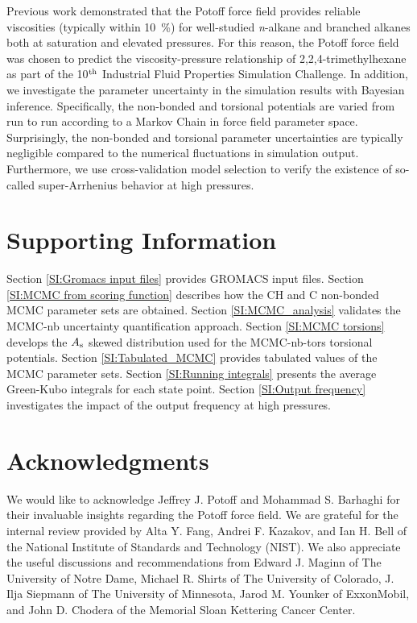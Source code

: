 \documentclass[preprint,review,12pt]{elsarticle}
\begin{document}
    Previous work demonstrated that the Potoff force field provides reliable viscosities (typically within 10~\%) for well-studied \textit{n}-alkane and branched alkanes both at saturation and elevated pressures. For this reason, the Potoff force field was chosen to predict the viscosity-pressure relationship of 2,2,4-trimethylhexane as part of the 10$^{\rm th}$ Industrial Fluid Properties Simulation Challenge. In addition, we investigate the parameter uncertainty in the simulation results with Bayesian inference. Specifically, the non-bonded and torsional potentials are varied from run to run according to a Markov Chain in force field parameter space. Surprisingly, the non-bonded and torsional parameter uncertainties are typically negligible compared to the numerical fluctuations in simulation output. Furthermore, we use cross-validation model selection to verify the existence of so-called super-Arrhenius behavior at high pressures.
	
	\section*{Supporting Information}
	
    Section \ref{SI:Gromacs input files} provides GROMACS input files. Section \ref{SI:MCMC from scoring function} describes how the CH and C non-bonded MCMC parameter sets are obtained. Section \ref{SI:MCMC_analysis} validates the MCMC-nb uncertainty quantification approach. Section \ref{SI:MCMC torsions} develops the $A_{\rm s}$ skewed distribution used for the MCMC-nb-tors torsional potentials. Section \ref{SI:Tabulated_MCMC} provides tabulated values of the MCMC parameter sets. Section \ref{SI:Running integrals} presents the average Green-Kubo integrals for each state point. Section \ref{SI:Output frequency} investigates the impact of the output frequency at high pressures.
	
	\section*{Acknowledgments}
	
	We would like to acknowledge Jeffrey J. Potoff and Mohammad S. Barhaghi for their invaluable insights regarding the Potoff force field. We are grateful for the internal review provided by Alta Y. Fang, Andrei F. Kazakov, and Ian H. Bell of the National Institute of Standards and Technology (NIST). We also appreciate the useful discussions and recommendations from Edward J. Maginn of The University of Notre Dame, Michael R. Shirts of The University of Colorado, J. Ilja Siepmann of The University of Minnesota, Jarod M. Younker of ExxonMobil, and John D. Chodera of the Memorial Sloan Kettering Cancer Center. 
	
\end{document}
